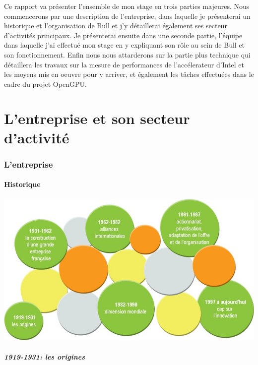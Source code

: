 \documentclass[11pt]{article}
\begin{document}
	Ce rapport va présenter l'ensemble de mon stage en trois parties majeures. Nous commencerons par une description de l'entreprise, 
	dans laquelle je présenterai un historique et l'organisation de Bull et j'y détaillerai également ses secteur d'activités principaux.
	Je présenterai ensuite dans une seconde partie, l'équipe dans laquelle j'ai effectué mon stage en y expliquant son rôle au sein de Bull 
	et son fonctionnement.
	Enfin nous nous attarderons sur la partie plus technique qui détaillera les travaux sur la mesure de performances de l'accélerateur 
	d'Intel et les moyens mis en oeuvre pour y arriver, et également les tâches effectuées dans le cadre du projet OpenGPU.

\newpage
{}
\part{L'entreprise et son secteur d'activité}
	\section{L'entreprise}
		\subsection{Historique}
		\begin{center}
		\includegraphics[scale=0.5]{histoire_fr.jpg}
		\end{center}
		\subsubsection{1919-1931: les origines}
\end{document}
